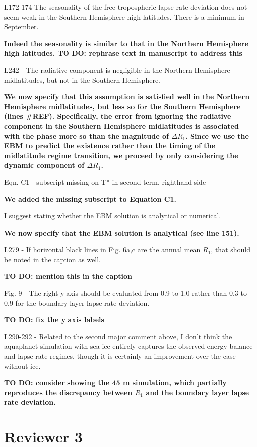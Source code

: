 \documentclass{article}
\begin{document}
L172-174 The seasonality of the free tropospheric lapse rate deviation does not seem weak in the Southern Hemisphere high latitudes. There is a minimum in September.

{\color{red}\textbf{Indeed the seasonality is similar to that in the Northern Hemisphere high latitudes. TO DO: rephrase text in manuscript to address this}}

L242 - The radiative component is negligible in the Northern Hemisphere midlatitudes, but not in the Southern Hemisphere.

\textbf{We now specify that this assumption is satisfied well in the Northern Hemisphere midlatitudes, but less so for the Southern Hemisphere (lines \#REF). Specifically, the error from ignoring the radiative component in the Southern Hemisphere midlatitudes is associated with the phase more so than the magnitude of $\Delta R_1$. Since we use the EBM to predict the existence rather than the timing of the midlatitude regime transition, we proceed by only considering the dynamic component of $\Delta R_1$.}

Eqn. C1 - subscript missing on T* in second term, righthand side

\textbf{We added the missing subscript to Equation C1.}

I suggest stating whether the EBM solution is analytical or numerical.

\textbf{We now specify that the EBM solution is analytical (see line 151).}

L279 - If horizontal black lines in Fig. 6a,c are the annual mean $R_1$, that should be noted in the caption as well.

{\color{red}\textbf{TO DO: mention this in the caption}}

Fig. 9 - The right y-axis should be evaluated from 0.9 to 1.0 rather than 0.3 to 0.9 for the boundary layer lapse rate deviation.

{\color{red}\textbf{TO DO: fix the y axis labels}}

L290-292 - Related to the second major comment above, I don't think the aquaplanet simulation with sea ice entirely captures the observed energy balance and lapse rate regimes, though it is certainly an improvement over the case without ice.

{\color{red}\textbf{TO DO: consider showing the 45 m simulation, which partially reproduces the discrepancy between $R_1$ and the boundary layer lapse rate deviation.}}

\section*{Reviewer 3}
\end{document}
